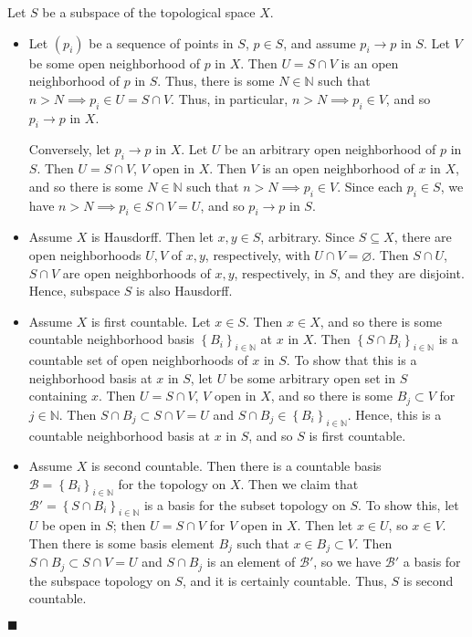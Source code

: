 \documentclass[12pt]{article}
\renewcommand{\qed}{\hfill$\blacksquare$}
\renewenvironment{proof}{\begin{addmargin}[1em]{0em}\begin{newproof}}{\end{newproof}\end{addmargin}\qed}
\begin{document}
\begin{proof}
Let $S$ be a subspace of the topological space $X$.
\begin{itemize}
	\item Let $\left(p_i\right)$ be a sequence of points in $S$, $p\in S$, and assume $p_i\rightarrow p$ in $S$. Let $V$ be some open neighborhood of $p$ in $X$. Then $U = S\cap V$ is an open neighborhood of $p$ in $S$. Thus, there is some $N\in \mathbb{N}$ such that $n>N \implies p_i \in U = S\cap V$. Thus, in particular, $n>N \implies p_i \in V$, and so $p_i \rightarrow p$ in $X$. 
	
	Conversely, let $p_i \rightarrow p$ in $X$. Let $U$ be an arbitrary open neighborhood of $p$ in $S$. Then $U=S\cap V$, $V$ open in $X$. Then $V$ is an open neighborhood of $x$ in $X$, and so there is some $N\in \mathbb{N}$ such that $n>N\implies p_i \in V$. {\color{red} Since each $p_i\in S$}, we have $ n> N \implies p_i \in S\cap V = U$, and so $p_i\rightarrow p$ in $S$.
	\item Assume $X$ is Hausdorff. Then let $x,y \in S$, arbitrary. Since $S\subseteq X$, there are open neighborhoods $U,V$ of $x,y$, respectively, with $U\cap V=\varnothing$. Then $S\cap U$, $S\cap V$ are open neighborhoods of $x,y$, respectively, in $S$, and they are disjoint. Hence, subspace $S$ is also Hausdorff.
	\item Assume $X$ is first countable. Let $x\in S$. Then $x \in X$, and so there is some countable neighborhood basis $\left\{B_i\right\}_{i\in \mathbb{N}}$ at $x$ in $X$. Then $\left\{S\cap B_i\right\}_{i\in\mathbb{N}}$ is a countable set of open neighborhoods of $x$ in $S$. To show that this is a neighborhood basis at $x$ in $S$, let $U$ be some arbitrary open set in $S$ containing $x$. Then $U = S\cap V$, $V$ open in $X$, and so there is some $B_j \subset V$ for $j\in \mathbb{N}$. Then $S\cap B_j \subset S\cap V = U$ and $S\cap B_j \in \left\{B_i\right\}_{i\in \mathbb{N}}$. Hence, this is a countable neighborhood basis at $x$ in $S$, and so $S$ is first countable.
	\item Assume $X$ is second countable. Then there is a countable basis $\mathcal{B} = \left\{B_i\right\}_{i\in \mathbb{N}}$ for the topology on $X$. Then we claim that $\mathcal{B}' = \left\{S\cap B_i\right\}_{i \in \mathbb{N}}$ is a basis for the subset topology on $S$. To show this, let $U$ be open in $S$; then $U=S\cap V$ for $V$ open in $X$. Then let $x \in U$, so $x\in V$. Then there is some basis element $B_j$ such that $x \in B_j \subset V$. Then $S\cap B_j \subset S\cap V = U $ and $S\cap B_j$ is an element of $\mathcal{B}'$, so we have $\mathcal{B}'$ a basis for the subspace topology on $S$, and it is certainly countable. Thus, $S$ is second countable.
\end{itemize}
\end{proof}
\end{document}
